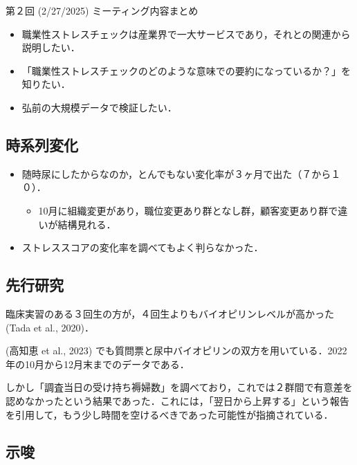 \documentclass[
]{ltjsarticle}
\providecommand{\tightlist}{%
  \setlength{\itemsep}{0pt}\setlength{\parskip}{0pt}}\usepackage{longtable,booktabs,array}
\begin{document}
第２回 (2/27/2025) ミーティング内容まとめ

\begin{itemize}
\tightlist
\item
  職業性ストレスチェックは産業界で一大サービスであり，それとの関連から説明したい．
\item
  「職業性ストレスチェックのどのような意味での要約になっているか？」を知りたい．
\item
  {弘前の大規模データで検証したい}．
\end{itemize}

\subsection{時系列変化}\label{ux6642ux7cfbux5217ux5909ux5316}

\begin{itemize}
\tightlist
\item
  随時尿にしたからなのか，とんでもない変化率が３ヶ月で出た（７から１０）．

  \begin{itemize}
  \tightlist
  \item
    10月に組織変更があり，職位変更あり群となし群，顧客変更あり群で違いが結構見れる．
  \end{itemize}
\item
  ストレススコアの変化率を調べてもよく判らなかった．
\end{itemize}

\subsection{先行研究}\label{ux5148ux884cux7814ux7a76}

臨床実習のある３回生の方が，４回生よりもバイオピリンレベルが高かった
(Tada et al., 2020)．

(高知恵 et al., 2023)
でも質問票と尿中バイオピリンの双方を用いている．2022年の10月から12月末までのデータである．

しかし「調査当日の受け持ち褥婦数」を調べており，これでは２群間で有意差を認めなかったという結果であった．これには，「翌日から上昇する」という報告を引用して，もう少し時間を空けるべきであった可能性が指摘されている．

\subsection{示唆}\label{ux793aux5506}
\end{document}
